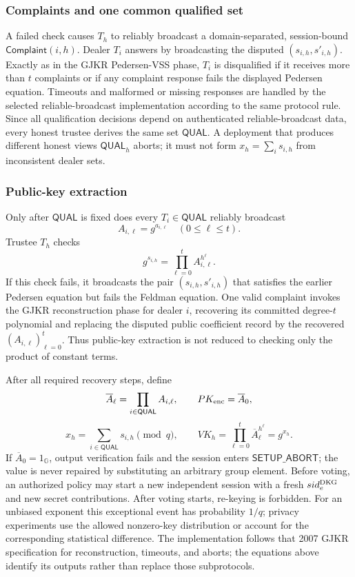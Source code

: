 \documentclass[pdflatex,sn-mathphys-num]{sn-jnl}%
\theoremstyle{thmstyleone}%
\theoremstyle{thmstyletwo}%
\theoremstyle{thmstylethree}%
\begin{document}
\subsubsection{Complaints and one common qualified set}
A failed check causes $T_h$ to reliably broadcast a domain-separated,
session-bound $\mathsf{Complaint}(i,h)$.  Dealer $T_i$ answers by broadcasting
the disputed $(s_{i,h},s'_{i,h})$.  Exactly as in the GJKR Pedersen-VSS phase,
$T_i$ is disqualified if it receives more than $t$ complaints or if any
complaint response fails the displayed Pedersen equation.  Timeouts and
malformed or missing responses are handled by the selected reliable-broadcast
implementation according to the same protocol rule.  Since all qualification
decisions depend on authenticated reliable-broadcast data, every honest
trustee derives the same set $\mathsf{QUAL}$.  A deployment that produces
different honest views $\mathsf{QUAL}_h$ aborts; it must not form
$x_h=\sum_i s_{i,h}$ from inconsistent dealer sets.

\subsubsection{Public-key extraction}
Only after $\mathsf{QUAL}$ is fixed does every $T_i\in\mathsf{QUAL}$ reliably
broadcast
\[
 A_{i,\ell}=g^{a_{i,\ell}}\quad(0\leq\ell\leq t).
\]
Trustee $T_h$ checks
\[
 g^{s_{i,h}}=\prod_{\ell=0}^{t}A_{i,\ell}^{h^\ell}.
\]
If this check fails, it broadcasts the pair
$(s_{i,h},s'_{i,h})$ that satisfies the earlier Pedersen equation but fails
the Feldman equation.  One valid complaint invokes the GJKR reconstruction
phase for dealer $i$, recovering its committed degree-$t$ polynomial and
replacing the disputed public coefficient record by the recovered
$(A_{i,\ell})_{\ell=0}^{t}$.  Thus public-key extraction is not reduced to
checking only the product of constant terms.

After all required recovery steps, define
\[
 \overline A_\ell=\prod_{i\in\mathsf{QUAL}}A_{i,\ell},
 \qquad
 PK_{\rm enc}=\overline A_0,
\]
\[
 x_h=\sum_{i\in\mathsf{QUAL}}s_{i,h}\pmod q,
 \qquad
 VK_h=\prod_{\ell=0}^{t}\overline A_\ell^{h^\ell}=g^{x_h}.
\]
If $\overline A_0=1_{\mathbb G}$, output verification fails and the session
enters $\mathsf{SETUP\_ABORT}$; the value is never repaired by substituting an
arbitrary group element.  Before voting, an authorized policy may start a new
independent session with a fresh $sid_e^{\rm DKG}$ and new secret
contributions.  After voting starts, re-keying is forbidden.  For an unbiased
exponent this exceptional event has probability $1/q$; privacy experiments
use the allowed nonzero-key distribution or account for the corresponding
statistical difference.
The implementation follows that 2007 GJKR specification for reconstruction,
timeouts, and aborts; the equations above identify its outputs rather than
replace those subprotocols.
\end{document}
